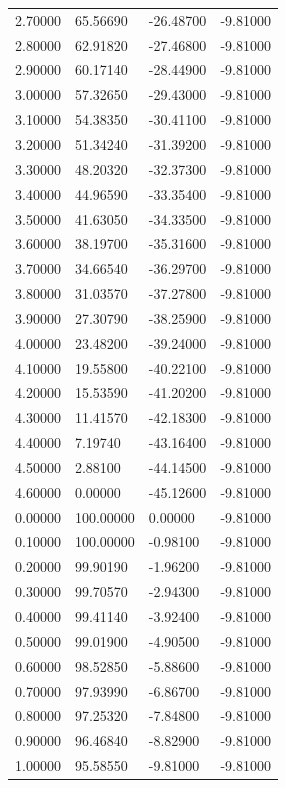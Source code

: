 \begin{table}
\begin{tabular}{llll}
2.70000 & 65.56690 & -26.48700 & -9.81000 \\
2.80000 & 62.91820 & -27.46800 & -9.81000 \\
2.90000 & 60.17140 & -28.44900 & -9.81000 \\
3.00000 & 57.32650 & -29.43000 & -9.81000 \\
3.10000 & 54.38350 & -30.41100 & -9.81000 \\
3.20000 & 51.34240 & -31.39200 & -9.81000 \\
3.30000 & 48.20320 & -32.37300 & -9.81000 \\
3.40000 & 44.96590 & -33.35400 & -9.81000 \\
3.50000 & 41.63050 & -34.33500 & -9.81000 \\
3.60000 & 38.19700 & -35.31600 & -9.81000 \\
3.70000 & 34.66540 & -36.29700 & -9.81000 \\
3.80000 & 31.03570 & -37.27800 & -9.81000 \\
3.90000 & 27.30790 & -38.25900 & -9.81000 \\
4.00000 & 23.48200 & -39.24000 & -9.81000 \\
4.10000 & 19.55800 & -40.22100 & -9.81000 \\
4.20000 & 15.53590 & -41.20200 & -9.81000 \\
4.30000 & 11.41570 & -42.18300 & -9.81000 \\
4.40000 & 7.19740 & -43.16400 & -9.81000 \\
4.50000 & 2.88100 & -44.14500 & -9.81000 \\
4.60000 & 0.00000 & -45.12600 & -9.81000 \\
0.00000 & 100.00000 & 0.00000 & -9.81000 \\
0.10000 & 100.00000 & -0.98100 & -9.81000 \\
0.20000 & 99.90190 & -1.96200 & -9.81000 \\
0.30000 & 99.70570 & -2.94300 & -9.81000 \\
0.40000 & 99.41140 & -3.92400 & -9.81000 \\
0.50000 & 99.01900 & -4.90500 & -9.81000 \\
0.60000 & 98.52850 & -5.88600 & -9.81000 \\
0.70000 & 97.93990 & -6.86700 & -9.81000 \\
0.80000 & 97.25320 & -7.84800 & -9.81000 \\
0.90000 & 96.46840 & -8.82900 & -9.81000 \\
1.00000 & 95.58550 & -9.81000 & -9.81000 \\

\end{tabular}
\end{table}
